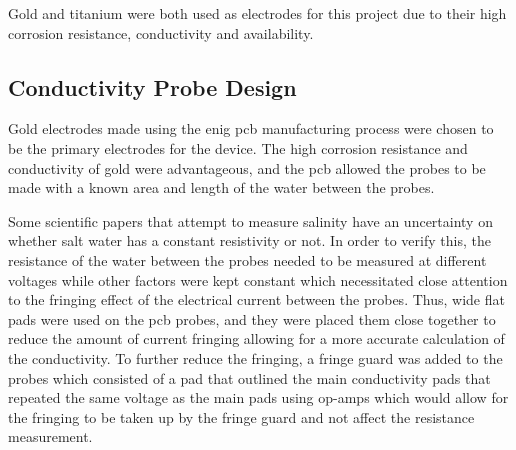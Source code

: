 Gold and titanium were both used as electrodes for this project due to their high corrosion resistance, conductivity and availability.

\subsection{Conductivity Probe Design}

Gold electrodes made using the \gls{enig} \gls{pcb} manufacturing process were chosen to be the primary electrodes for the device.
The high corrosion resistance and conductivity of gold were advantageous, and the \gls{pcb} allowed the probes to be made with a known area and length of the water between the probes.

Some scientific papers that attempt to measure salinity have an uncertainty on whether salt water has a constant resistivity or not.
In order to verify this, the resistance of the water between the probes needed to be measured at different voltages while other factors were kept constant which necessitated close attention to the fringing effect of the electrical current between the probes.
Thus, wide flat pads were used on the \gls{pcb} probes, and they were placed them close together to reduce the amount of current fringing allowing for a more accurate calculation of the conductivity.
To further reduce the fringing, a fringe guard was added to the probes which consisted of a pad that outlined the main conductivity pads that repeated the same voltage as the main pads using op-amps which would allow for the fringing to be taken up by the fringe guard and not affect the resistance measurement. 

